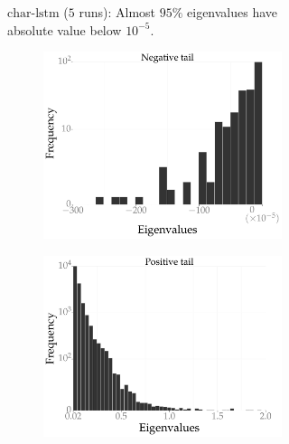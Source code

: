 \documentclass[10pt]{article}
\newcommand{\charlstm}{\textrm{char-lstm}}
\begin{document}
\begin{figure}[!tbh]
\begin{subfigure}[t]{0.47 \textwidth}
        \caption{\small $\charlstm$ ($5$ runs): Almost $95\%$ eigenvalues have absolute value below $10^{-5}$.}
        \label{fig:charlstm_hessian}
    \end{subfigure}
    \begin{subfigure}[b]{\textwidth}
        \centering
        \begin{subfigure}[b]{0.47 \textwidth}
        \includegraphics[width=\textwidth]{allcnn_dm.pdf}
        \end{subfigure}
        \hspace{0.2in}
        \begin{subfigure}[b]{0.47 \textwidth}
        \includegraphics[width=\textwidth]{allcnn_dp.pdf}

\end{subfigure}
\end{subfigure}
\end{figure}
\end{document}
